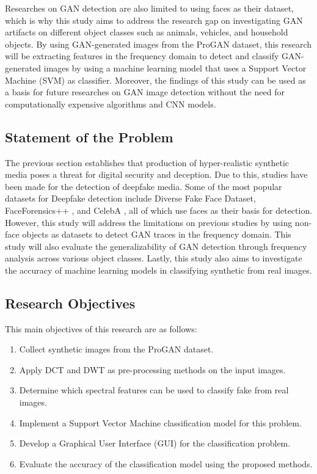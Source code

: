 \documentclass[journal]{./IEEE/IEEEtran}
\begin{document}
\par Researches on GAN detection are also limited to using faces as their dataset, which is why this study aims to address the research gap on investigating GAN artifacts on different object classes such as animals, vehicles, and household objects. By using GAN-generated images from the ProGAN dataset, this research will be extracting features in the frequency domain to detect and classify GAN-generated images by using a machine learning model that uses a Support Vector Machine (SVM) as classifier. Moreover, the findings of this study can be used as a basis for future researches on GAN image detection without the need for computationally expensive algorithms and CNN models. 


\subsection{Statement of the Problem}

The previous section establishes that production of hyper-realistic synthetic media poses a threat for digital security and deception. Due to this, studies have been made for the detection of deepfake media\cite{deepfakeLR}. Some of the most popular datasets for Deepfake detection include Diverse Fake Face Dataset\cite{dffd}, FaceForensics++ \cite{faceforensics++}, and CelebA \cite{celeb-a}, all of which use faces as their basis for detection. However, this study will address the limitations on previous studies \cite{lev-freq-dct}\cite{fighting-dct}\cite{dwt}\cite{dwt2} by using non-face objects as datasets to detect GAN traces in the frequency domain. This study will also evaluate the generalizability of GAN detection through frequency analysis across various object classes. Lastly, this study also aims to investigate the accuracy of machine learning models in classifying synthetic from real images. 

\subsection{Research Objectives}
This main objectives of this research are as follows: 
\begin{enumerate}
    \item Collect synthetic images from the ProGAN dataset.
    \item Apply DCT and DWT as pre-processing methods on the input images.
    \item Determine which spectral features can be used to classify fake from real images.
    \item Implement a Support Vector Machine classification model for this problem.
    \item Develop a Graphical User Interface (GUI) for the classification problem.
    \item Evaluate the accuracy of the classification model using the proposed methods.
\end{enumerate}
\end{document}
